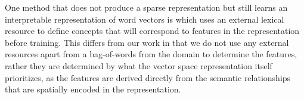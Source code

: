One method that does not produce a sparse representation but still learns an interpretable representation of word vectors is \cite{Koc} which uses an external lexical resource to define  concepts that will correspond to features in the representation before training. This differs from our work in that we do not use any external resources apart from a bag-of-words from the domain to determine the features, rather they are determined by what the vector space representation itself prioritizes, as the features are derived directly from the semantic relationships that are spatially encoded in the representation. 















